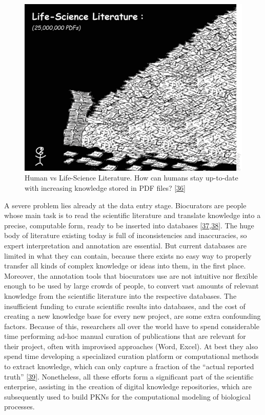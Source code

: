 \documentclass[
  12pt,
]{book}
\begin{document}
\begin{figure}

{\centering \includegraphics[width=0.75\linewidth]{img/papers} 

}

\caption{Human vs Life-Science Literature. How can humans stay up-to-date with increasing knowledge stored in PDF files? {[}\protect\hyperlink{ref-Vercruysse2019a}{36}{]}}\label{fig:fig2}
\end{figure}

A severe problem lies already at the data entry stage.
Biocurators are people whose main task is to read the scientific literature and translate knowledge into a precise, computable form, ready to be inserted into databases {[}\protect\hyperlink{ref-Howe2008}{37},\protect\hyperlink{ref-Ammari2018}{38}{]}.
The huge body of literature existing today is full of inconsistencies and inaccuracies, so expert interpretation and annotation are essential.
But current databases are limited in what they can contain, because there exists no easy way to properly transfer all kinds of complex knowledge or ideas into them, in the first place.
Moreover, the annotation tools that biocurators use are not intuitive nor flexible enough to be used by large crowds of people, to convert vast amounts of relevant knowledge from the scientific literature into the respective databases.
The insufficient funding to curate scientific results into databases, and the cost of creating a new knowledge base for every new project, are some extra confounding factors.
Because of this, researchers all over the world have to spend considerable time performing ad-hoc manual curation of publications that are relevant for their project, often with improvised approaches (Word, Excel).
At best they also spend time developing a specialized curation platform or computational methods to extract knowledge, which can only capture a fraction of the ``actual reported truth'' {[}\protect\hyperlink{ref-Jenssen2001}{39}{]}.
Nonetheless, all these efforts form a significant part of the scientific enterprise, assisting in the creation of digital knowledge repositories, which are subsequently used to build PKNs for the computational modeling of biological processes.
\end{document}
